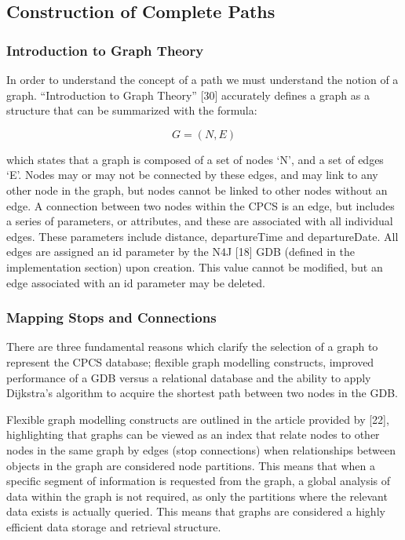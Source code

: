\documentclass[12pt]{article}   	%
\begin{document}
\subsection{Construction of Complete Paths}
\subsubsection{Introduction to Graph Theory}
In order to understand the concept of a path we must understand the notion of a graph. “Introduction to Graph Theory” [30] accurately defines a graph as a structure that can be summarized with the formula:

\hfill
\noindent
\[ G = (N,E) \]

\noindent
which states that a graph is composed of a set of nodes ‘N’, and a set of edges ‘E’. Nodes may or may not be connected by these edges, and may link to any other node in the graph, but nodes cannot be linked to other nodes without an edge. A connection between two nodes within the CPCS is an edge, but includes a series of parameters, or attributes, and these are associated with all individual edges. These parameters include distance, departureTime and departureDate. All edges are assigned an id parameter by the N4J [18] GDB (defined in the implementation section) upon creation. This value cannot be modified, but an edge associated with an id parameter may be deleted.

\subsubsection{Mapping Stops and Connections}
There are three fundamental reasons which clarify the selection of a graph to represent the CPCS database; flexible graph modelling constructs, improved performance of a GDB versus a relational database and the ability to apply Dijkstra’s algorithm to acquire the shortest path between two nodes in the GDB.

Flexible graph modelling constructs are outlined in the article provided by [22], highlighting that graphs can be viewed as an index that relate nodes to other nodes in the same graph by edges (stop connections) when relationships between objects in the graph are considered node partitions. This means that when a specific segment of information is requested from the graph, a global analysis of data within the graph is not required, as only the partitions where the relevant data exists is actually queried. This means that graphs are considered a highly efficient data storage and retrieval structure.
\end{document}
